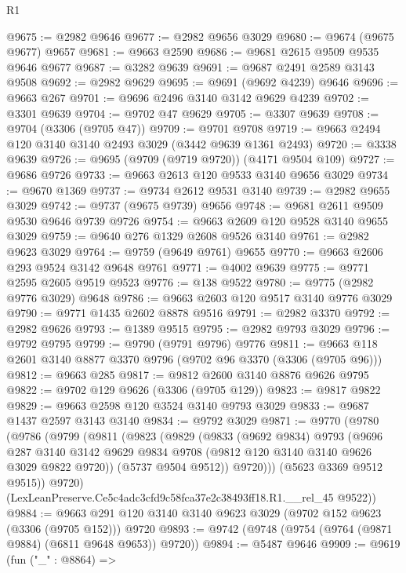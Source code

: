\begin{lexlean}{R1}
\begin{coremodule}
@9675 := @2982 @9646
@9677 := @2982 @9656 @3029
@9680 := @9674 (@9675 @9677) @9657
@9681 := @9663 @2590
@9686 := @9681 @2615 @9509 @9535 @9646 @9677
@9687 := @3282 @9639
@9691 := @9687 @2491 @2589 @3143 @9508
@9692 := @2982 @9629
@9695 := @9691 (@9692 @4239) @9646
@9696 := @9663 @267
@9701 := @9696 @2496 @3140 @3142 @9629 @4239
@9702 := @3301 @9639
@9704 := @9702 @47 @9629
@9705 := @3307 @9639
@9708 := @9704 (@3306 (@9705 @47))
@9709 := @9701 @9708
@9719 := @9663 @2494 @120 @3140 @3140 @2493 @3029 (@3442 @9639 @1361 @2493)
@9720 := @3338 @9639
@9726 := @9695 (@9709 (@9719 @9720)) (@4171 @9504 @109)
@9727 := @9686 @9726
@9733 := @9663 @2613 @120 @9533 @3140 @9656 @3029
@9734 := @9670 @1369
@9737 := @9734 @2612 @9531 @3140
@9739 := @2982 @9655 @3029
@9742 := @9737 (@9675 @9739) @9656
@9748 := @9681 @2611 @9509 @9530 @9646 @9739 @9726
@9754 := @9663 @2609 @120 @9528 @3140 @9655 @3029
@9759 := @9640 @276 @1329 @2608 @9526 @3140
@9761 := @2982 @9623 @3029
@9764 := @9759 (@9649 @9761) @9655
@9770 := @9663 @2606 @293 @9524 @3142 @9648 @9761
@9771 := @4002 @9639
@9775 := @9771 @2595 @2605 @9519 @9523
@9776 := @138 @9522
@9780 := @9775 (@2982 @9776 @3029) @9648
@9786 := @9663 @2603 @120 @9517 @3140 @9776 @3029
@9790 := @9771 @1435 @2602 @8878 @9516
@9791 := @2982 @3370
@9792 := @2982 @9626
@9793 := @1389 @9515
@9795 := @2982 @9793 @3029
@9796 := @9792 @9795
@9799 := @9790 (@9791 @9796) @9776
@9811 := @9663 @118 @2601 @3140 @8877 @3370 @9796 (@9702 @96 @3370 (@3306 (@9705 @96)))
@9812 := @9663 @285
@9817 := @9812 @2600 @3140 @8876 @9626 @9795
@9822 := @9702 @129 @9626 (@3306 (@9705 @129))
@9823 := @9817 @9822
@9829 := @9663 @2598 @120 @3524 @3140 @9793 @3029
@9833 := @9687 @1437 @2597 @3143 @3140
@9834 := @9792 @3029
@9871 := @9770
    (@9780
      (@9786
        (@9799
          (@9811
            (@9823
              (@9829
                (@9833
                  (@9692 @9834)
                  @9793
                  (@9696
                    @287
                    @3140
                    @3142
                    @9629
                    @9834
                    @9708
                    (@9812 @120 @3140 @3140 @9626 @3029 @9822 @9720))
                  (@5737 @9504 @9512))
                @9720)))
          (@5623 @3369 @9512 @9515))
        @9720)
      (LexLeanPreserve.Ce5c4adc3cfd9c58fca37e2c38493ff18.R1.__rel_45 @9522))
@9884 := @9663 @291 @120 @3140 @3140 @9623 @3029 (@9702 @152 @9623 (@3306 (@9705 @152))) @9720
@9893 := @9742 (@9748 (@9754 (@9764 (@9871 @9884) (@6811 @9648 @9653)) @9720))
@9894 := @5487 @9646
@9909 := @9619
    (fun ("_" : @8864) =>

\end{coremodule}
\end{lexlean}
